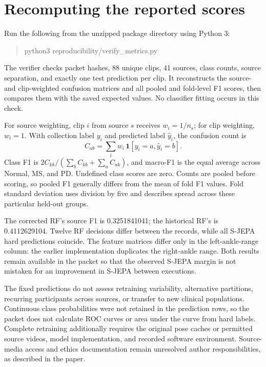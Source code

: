 \documentclass[10pt,twocolumn,letterpaper]{article}
\begin{document}
\section{Recomputing the reported scores}
Run the following from the unzipped package directory using Python 3:
\begin{quote}\small\ttfamily
python3 reproducibility/verify\_metrics.py
\end{quote}
The verifier checks packet hashes, 88 unique clips, 41 sources, class counts, source separation, and exactly one test prediction per clip. It reconstructs the source- and clip-weighted confusion matrices and all pooled and fold-level F1 scores, then compares them with the saved expected values. No classifier fitting occurs in this check.

For source weighting, clip $i$ from source $s$ receives $w_i=1/n_s$; for clip weighting, $w_i=1$. With collection label $y_i$ and predicted label $\widehat y_i$, the confusion count is
\begin{equation}
C_{ab}=\sum_i w_i\,\mathbf{1}[y_i=a,\widehat y_i=b].
\end{equation}
Class F1 is $2C_{kk}/(\sum_b C_{kb}+\sum_a C_{ak})$, and macro-F1 is the equal average across Normal, MS, and PD. Undefined class scores are zero. Counts are pooled before scoring, so pooled F1 generally differs from the mean of fold F1 values. Fold standard deviation uses division by five and describes spread across these particular held-out groups.

The corrected RF's source F1 is 0.3251841041; the historical RF's is 0.4112629104. Twelve RF decisions differ between the records, while all S-JEPA hard predictions coincide. The feature matrices differ only in the left-ankle-range column: the earlier implementation duplicates the right-ankle range. Both results remain available in the packet so that the observed S-JEPA margin is not mistaken for an improvement in S-JEPA between executions.

The fixed predictions do not assess retraining variability, alternative partitions, recurring participants across sources, or transfer to new clinical populations. Continuous class probabilities were not retained in the prediction rows, so the packet does not calculate ROC curves or area under the curve from hard labels. Complete retraining additionally requires the original pose caches or permitted source videos, model implementation, and recorded software environment. Source-media access and ethics documentation remain unresolved author responsibilities, as described in the paper.
\end{document}
